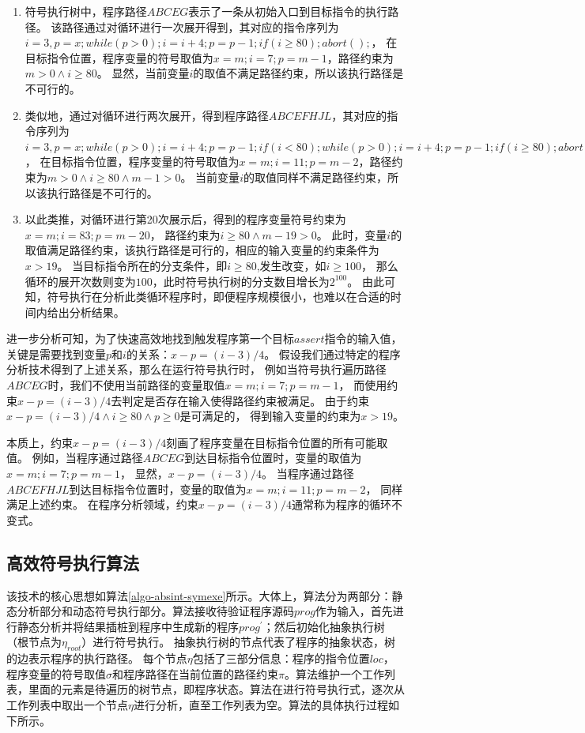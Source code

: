 \begin{enumerate}
\item 符号执行树中，程序路径$ABCEG$表示了一条从初始入口到目标指令的执行路径。
该路径通过对循环进行一次展开得到，其对应的指令序列为
$i=3,p=x;while(p>0);i=i+4;p=p-1;if(i\geq 80);abort();$，
在目标指令位置，程序变量的符号取值为$x=m;i=7;p=m-1$，路径约束为$m>0\wedge i\geq 80$。
显然，当前变量$i$的取值不满足路径约束，所以该执行路径是不可行的。
\item 类似地，通过对循环进行两次展开，得到程序路径$ABCEFHJL$，其对应的指令序列为
$i=3,p=x;while(p>0);i=i+4;p=p-1;if(i < 80);while(p>0);i=i+4;p=p-1;if(i\geq 80);abort()$，
在目标指令位置，程序变量的符号取值为$x=m;i=11;p=m-2$，路径约束为$m>0\wedge i\geq 80 \wedge m-1>0$。
当前变量$i$的取值同样不满足路径约束，所以该执行路径是不可行的。
\item 以此类推，对循环进行第20次展示后，得到的程序变量符号约束为$x=m;i=83;p=m-20$，
路径约束为$i\geq 80 \wedge m-19>0$。
此时，变量$i$的取值满足路径约束，该执行路径是可行的，相应的输入变量的约束条件为$x>19$。
当目标指令所在的分支条件，即$i\geq 80$,发生改变，如$i\geq 100$，
那么循环的展开次数则变为$100$，此时符号执行树的分支数目增长为$2^{100}$。
由此可知，符号执行在分析此类循环程序时，即便程序规模很小，也难以在合适的时间内给出分析结果。
\end{enumerate}

进一步分析可知，为了快速高效地找到触发程序第一个目标$assert$指令的输入值，
关键是需要找到变量$p$和$i$的关系：$x-p = (i-3)/4$。
假设我们通过特定的程序分析技术得到了上述关系，那么在运行符号执行时，
例如当符号执行遍历路径$ABCEG$时，我们不使用当前路径的变量取值$x=m;i=7;p=m-1$，
而使用约束$x-p = (i-3)/4$去判定是否存在输入使得路径约束被满足。
由于约束$x-p = (i-3)/4 \wedge i\geq 80 \wedge p \geq 0$是可满足的，
得到输入变量的约束为$x>19$。

本质上，约束$x-p = (i-3)/4$刻画了程序变量在目标指令位置的所有可能取值。
例如，当程序通过路径$ABCEG$到达目标指令位置时，变量的取值为$x=m;i=7;p=m-1$，
显然，$x-p = (i-3)/4$。
当程序通过路径$ABCEFHJL$到达目标指令位置时，变量的取值为$x=m;i=11;p=m-2$，
同样满足上述约束。
在程序分析领域，约束$x-p = (i-3)/4$通常称为程序的循环不变式。


\subsection{高效符号执行算法}

该技术的核心思想如算法\ref{algo-absint-symexe}所示。大体上，算法分为两部分：静态分析部分和动态符号执行部分。算法接收待验证程序源码$prog$作为输入，首先进行静态分析并将结果插桩到程序中生成新的程序$prog^{'}$；然后初始化抽象执行树（根节点为$\eta_{root}$）进行符号执行。
抽象执行树的节点代表了程序的抽象状态，树的边表示程序的执行路径。
每个节点$\eta$包括了三部分信息：程序的指令位置$loc$，程序变量的符号取值$\sigma$和程序路径在当前位置的路径约束$\pi$。算法维护一个工作列表，里面的元素是待遍历的树节点，即程序状态。算法在进行符号执行式，逐次从工作列表中取出一个节点$\eta$进行分析，直至工作列表为空。算法的具体执行过程如下所示。

